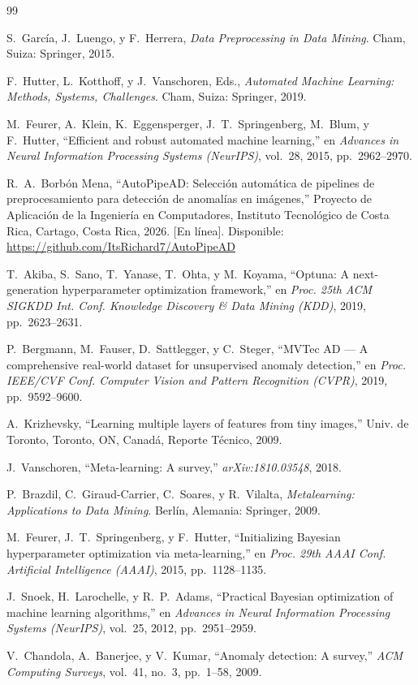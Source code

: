 \documentclass[12pt,letterpaper]{article}
\begin{document}
\newpage
{}
\begin{thebibliography}{99}

S.~García, J.~Luengo, y F.~Herrera, \emph{Data Preprocessing in Data Mining}. Cham, Suiza: Springer, 2015.

F.~Hutter, L.~Kotthoff, y J.~Vanschoren, Eds., \emph{Automated Machine Learning: Methods, Systems, Challenges}. Cham, Suiza: Springer, 2019.

M.~Feurer, A.~Klein, K.~Eggensperger, J.~T.~Springenberg, M.~Blum, y F.~Hutter, ``Efficient and robust automated machine learning,'' en \emph{Advances in Neural Information Processing Systems (NeurIPS)}, vol.~28, 2015, pp.~2962--2970.

R.~A.~Borbón Mena, ``AutoPipeAD: Selección automática de pipelines de preprocesamiento para detección de anomalías en imágenes,'' Proyecto de Aplicación de la Ingeniería en Computadores, Instituto Tecnológico de Costa Rica, Cartago, Costa Rica, 2026. [En línea]. Disponible: \url{https://github.com/ItsRichard7/AutoPipeAD}

T.~Akiba, S.~Sano, T.~Yanase, T.~Ohta, y M.~Koyama, ``Optuna: A next-generation hyperparameter optimization framework,'' en \emph{Proc. 25th ACM SIGKDD Int. Conf. Knowledge Discovery \& Data Mining (KDD)}, 2019, pp.~2623--2631.

P.~Bergmann, M.~Fauser, D.~Sattlegger, y C.~Steger, ``MVTec AD --- A comprehensive real-world dataset for unsupervised anomaly detection,'' en \emph{Proc. IEEE/CVF Conf. Computer Vision and Pattern Recognition (CVPR)}, 2019, pp.~9592--9600.

A.~Krizhevsky, ``Learning multiple layers of features from tiny images,'' Univ. de Toronto, Toronto, ON, Canadá, Reporte Técnico, 2009.

J.~Vanschoren, ``Meta-learning: A survey,'' \emph{arXiv:1810.03548}, 2018.

P.~Brazdil, C.~Giraud-Carrier, C.~Soares, y R.~Vilalta, \emph{Metalearning: Applications to Data Mining}. Berlín, Alemania: Springer, 2009.

M.~Feurer, J.~T.~Springenberg, y F.~Hutter, ``Initializing Bayesian hyperparameter optimization via meta-learning,'' en \emph{Proc. 29th AAAI Conf. Artificial Intelligence (AAAI)}, 2015, pp.~1128--1135.

J.~Snoek, H.~Larochelle, y R.~P.~Adams, ``Practical Bayesian optimization of machine learning algorithms,'' en \emph{Advances in Neural Information Processing Systems (NeurIPS)}, vol.~25, 2012, pp.~2951--2959.

V.~Chandola, A.~Banerjee, y V.~Kumar, ``Anomaly detection: A survey,'' \emph{ACM Computing Surveys}, vol.~41, no.~3, pp.~1--58, 2009.

\end{thebibliography}
\end{document}
